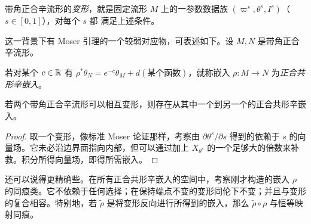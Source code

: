 \begin{definition*}
带角正合辛流形的\emph{变形}，就是固定流形 $M$ 上的一参数数据族 $(\varpi^s,\theta^s,I^s)$（$s\in[0,1]$），对每个 $s$ 都
满足上述条件。
\end{definition*}
这一背景下有 Moser 引理的一个较弱对应物，可表述如下。设 $M,N$ 是带角正合辛流形。
\begin{definition*}
若对某个 $c\in\mathbb R$ 有 $\rho^*\theta_N=e^{-c}\theta_M+d(\text{某个函数})$，就称嵌入 $\rho:M\to N$ 为\emph{正合共形辛嵌入}。
\end{definition*}
\begin{lemma}\label{st:7.1}
若两个带角正合辛流形可以相互变形，则存在从其中一个到另一个的正合共形辛嵌入。
\end{lemma}
\begin{proof}
取一个变形，像标准 Moser 论证那样，考察由 $\partial\theta^s/\partial s$ 得到的依赖于 $s$ 的向量场。它未必沿边界面指向内部，但可以通过加上 $X_{\theta^s}$ 的一个足够大的倍数来补救。积分所得向量场，即得所需嵌入。
\end{proof}
还可以说得更精确些。在所有正合共形辛嵌入的空间中，考察刚才构造的嵌入 $\rho$ 的同痕类。它不依赖于任何选择；在保持端点不变的变形同伦下不变；并且与变形的复合相容。特别地，若 $\tilde\rho$ 是将变形反向进行所得到的嵌入，那么 $\tilde\rho\circ\rho$ 与恒等映射同痕。

